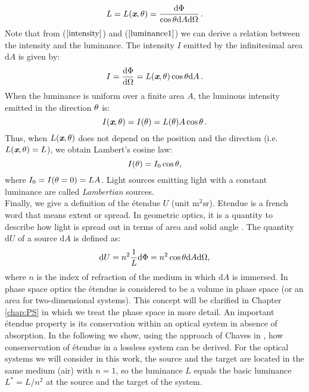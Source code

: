 \begin{equation}\label{luminance1}
  L=L(\textit{\textbf{x}}, \theta) = \frac{\textrm{d}\Phi}{\cos\theta\textrm{d}A\textrm{d}\Omega}\,.
\end{equation}
\noindent Note that from ($\ref{intensity}$) and ($\ref{luminance1}$) we can derive a relation between the intensity and the luminance. 
The intensity $I$ emitted by the infinitesimal area $\textrm{d}A$ is given by:
\begin{equation}\label{eq:int_lum}
I = \frac{\textrm{d}\Phi}{\textrm{d}\Omega}= L(\textit{\textbf{x}},\theta)\cos\theta\textrm{d}A \,.
\end{equation}
When the luminance is uniform over a finite area $A$, the luminous intensity emitted in the direction $\theta$ is:
\begin{equation}
I(\textit{\textbf{x}}, \theta) = I(\theta) = L(\theta) A \cos\theta\,.
\end{equation}
Thus, when $L(\textit{\textbf{x}},\theta)$ does not depend on the position and the direction (i.e. $L(\textit{\textbf{x}},\theta)=L$), we obtain Lambert's cosine law:
\begin{equation}
I(\theta) = I_0\cos\theta ,
\end{equation}
where $I_0 = I(\theta = 0) = LA$. Light sources emitting light with a constant luminance are called \textit{Lambertian} sources.\\
\indent Finally, we give a definition of the \'{e}tendue $U$ (unit $\textrm{m}^2\textrm{sr}$).
Etendue is a french word that means extent or spread. In geometric optics, it is a quantity to describe how light is spread out in terms of area and solid angle \cite{lerner2006etendue, zhu2011etendue}.
The quantity $ \textrm{d}U $ of a source $\textrm{d}A$ is defined as:
\begin{equation}\label{etendue}
\textrm{d}U = n^2  \frac{1}{L}\textrm{d}\Phi = n^2 \cos\theta\textrm{d}A\textrm{d}\Omega,
\end{equation}
where $n$ is the index of refraction of the medium in which $\textrm{d}A$ is immersed. In phase space optics the \'{e}tendue is considered to be a volume in phase space (or an area for two-dimensional systems). This concept will be clarified in Chapter \ref{chap:PS} in which we treat the phase space in more detail.
An important \'{e}tendue property is its conservation within an optical system in absence of absorption. 
In the following we show, using the approach of Chaves in \cite{chaves2015introduction}, 
how conserservation of \'{e}tendue in a lossless system can be derived. For the optical systems we will consider in this work, the source and the target are located in the same medium (air) with $n=1$, so the luminance $L$ equals the basic luminance $L^* = L/n^2$ at the source and the target of the system. 
